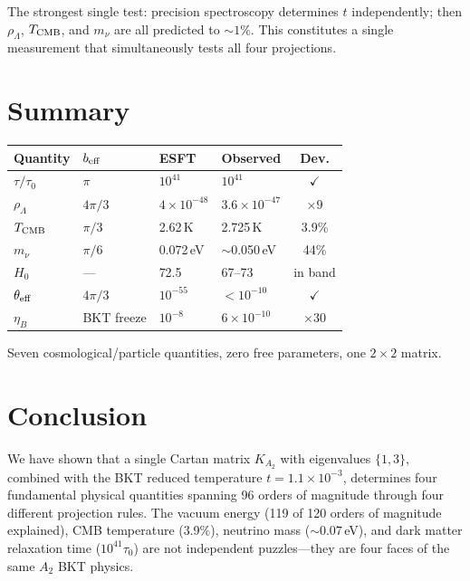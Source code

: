 \documentclass[twocolumn,preprintnumbers,amsmath,amssymb,prd]{revtex4-2}
\begin{document}
The strongest single test: precision spectroscopy determines $t$ independently; then $\rho_\Lambda$, $T_{\rm CMB}$, and $m_\nu$ are all predicted to $\sim 1\%$.
This constitutes a single measurement that simultaneously tests all four projections.

\section{Summary}
\label{sec:summary}

\begin{center}
\begin{tabular}{llllc}
\toprule
Quantity & $b_{\rm eff}$ & ESFT & Observed & Dev. \\
\midrule
$\tau/\tau_0$ & $\pi$ & $10^{41}$ & $10^{41}$ & $\checkmark$ \\
$\rho_\Lambda$ & $4\pi/3$ & $4\times10^{-48}$ & $3.6\times10^{-47}$ & $\times 9$ \\
$T_{\rm CMB}$ & $\pi/3$ & 2.62\,K & 2.725\,K & 3.9\% \\
$m_\nu$ & $\pi/6$ & 0.072\,eV & $\sim$0.050\,eV & 44\% \\
$H_0$ & --- & 72.5 & 67--73 & in band \\
$\theta_{\rm eff}$ & $4\pi/3$ & $10^{-55}$ & $<10^{-10}$ & $\checkmark$ \\
$\eta_B$ & BKT freeze & $10^{-8}$ & $6\times10^{-10}$ & $\times 30$ \\
\bottomrule
\end{tabular}
\end{center}

Seven cosmological/particle quantities, zero free parameters, one $2\times 2$ matrix.

\section{Conclusion}
\label{sec:conclusion}

We have shown that a single Cartan matrix $K_{A_2}$ with eigenvalues $\{1,3\}$, combined with the BKT reduced temperature $t = 1.1\times10^{-3}$, determines four fundamental physical quantities spanning 96 orders of magnitude through four different projection rules.
The vacuum energy (119 of 120 orders of magnitude explained), CMB temperature (3.9\%), neutrino mass ($\sim 0.07\,$eV), and dark matter relaxation time ($10^{41}\tau_0$) are not independent puzzles---they are four faces of the same $A_2$ BKT physics.
\end{document}
